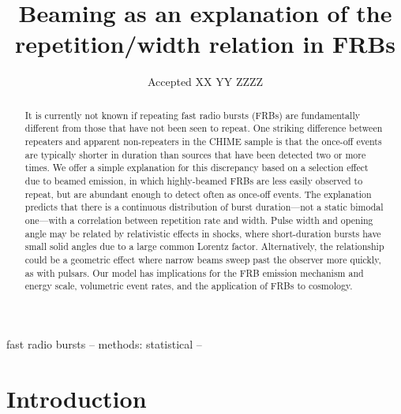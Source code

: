 \documentclass[fleqn,usenatbib]{mnras}
\title[FRB beaming]{Beaming as an explanation of the repetition/width relation in FRBs}
\date{Accepted XX YY ZZZZ}
\begin{document}
\label{firstpage}
\pagerange{\pageref{firstpage}--\pageref{lastpage}}
\maketitle


\begin{abstract}
    It is currently not known if repeating fast radio bursts (FRBs) are fundamentally different 
    from those that have not been seen to repeat. One striking difference between 
    repeaters and apparent non-repeaters in the CHIME sample is that the once-off events 
    are typically shorter in duration than sources that have been detected two or more times. 
    We offer a simple explanation for 
    this discrepancy based on a selection effect due to beamed emission, 
    in which highly-beamed FRBs are less easily
    observed to repeat, but are abundant enough to  detect often as once-off events. The explanation 
    predicts that there is a continuous distribution 
    of burst duration---not a static bimodal one---with a 
    correlation between repetition rate and width. Pulse width and opening angle 
    may be related by relativistic effects in shocks, 
    where short-duration bursts have small solid angles due to a large common Lorentz factor. Alternatively, the relationship 
    could be a geometric effect where narrow beams sweep past the observer more quickly, as with pulsars. Our model has implications 
    for the FRB emission mechanism and energy scale, volumetric event
    rates, and the application of FRBs to cosmology. 
\end{abstract}
\begin{keywords}
fast radio bursts -- methods: statistical --  
\end{keywords}

\section{Introduction}
\end{document}
